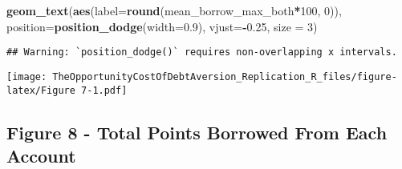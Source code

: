 \documentclass[
]{article}
\newenvironment{Shaded}{\begin{snugshade}}{\end{snugshade}}
\newcommand{\AttributeTok}[1]{\textcolor[rgb]{0.13,0.29,0.53}{#1}}
\newcommand{\DecValTok}[1]{\textcolor[rgb]{0.00,0.00,0.81}{#1}}
\newcommand{\FloatTok}[1]{\textcolor[rgb]{0.00,0.00,0.81}{#1}}
\newcommand{\FunctionTok}[1]{\textcolor[rgb]{0.13,0.29,0.53}{\textbf{#1}}}
\newcommand{\NormalTok}[1]{#1}
\newcommand{\SpecialCharTok}[1]{\textcolor[rgb]{0.81,0.36,0.00}{\textbf{#1}}}
\begin{document}
\begin{Shaded}
\begin{Highlighting}[]
  \FunctionTok{geom\_text}\NormalTok{(}\FunctionTok{aes}\NormalTok{(}\AttributeTok{label=}\FunctionTok{round}\NormalTok{(mean\_borrow\_max\_both}\SpecialCharTok{*}\DecValTok{100}\NormalTok{, }\DecValTok{0}\NormalTok{)), }\AttributeTok{position=}\FunctionTok{position\_dodge}\NormalTok{(}\AttributeTok{width=}\FloatTok{0.9}\NormalTok{), }\AttributeTok{vjust=}\SpecialCharTok{{-}}\FloatTok{0.25}\NormalTok{, }\AttributeTok{size =} \DecValTok{3}\NormalTok{)}
\end{Highlighting}
\end{Shaded}

\begin{verbatim}
## Warning: `position_dodge()` requires non-overlapping x intervals.
\end{verbatim}

\texttt{[image: TheOpportunityCostOfDebtAversion\_Replication\_R\_files/figure-latex/Figure 7-1.pdf]}

\subsection{Figure 8 - Total Points Borrowed From Each
Account}\label{figure-8---total-points-borrowed-from-each-account}
\end{document}
